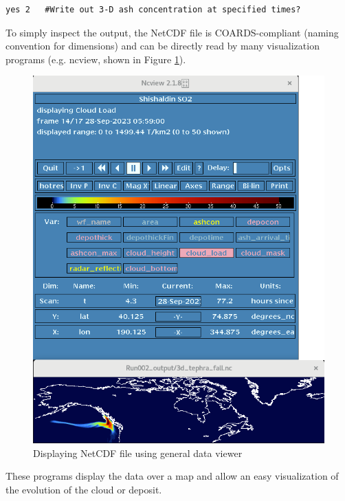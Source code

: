 \small
\begin{verbatim}
yes 2   #Write out 3-D ash concentration at specified times?                       
\end{verbatim}
\normalsize

To simply inspect the output, the NetCDF file is COARDS-compliant (naming
convention for dimensions) and can be directly read by many visualization
programs (e.g. ncview, shown in Figure \ref{FigAsh3dOutputncview}).
\begin{figure}[htbp]
\includegraphics[angle=0,scale=0.5]{Figures/Ash3d_Viz_ncview.png}
\parbox{15cm}{\caption{\label{FigAsh3dOutputncview}
Displaying NetCDF file using general data viewer}}
\end{figure}
These programs display the data over a map and allow an easy visualization
of the evolution of the cloud or deposit.

